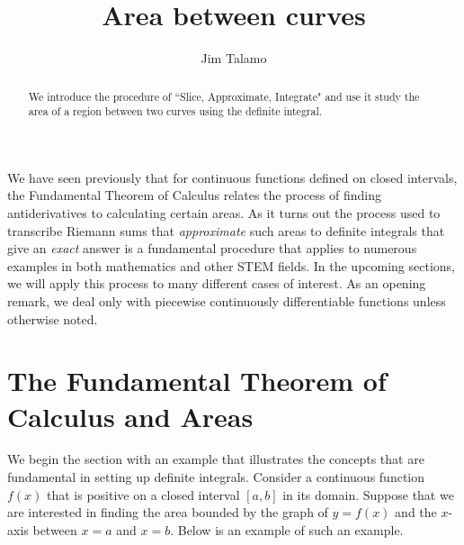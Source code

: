 \documentclass{ximera}
\author{Jim Talamo}
\title[Dig-In:]{Area between curves}
\begin{document}
\begin{abstract}
  We introduce the procedure of ``Slice, Approximate, Integrate" and use it study the area of a region between two curves using the definite integral.
\end{abstract}
\maketitle

We have seen previously that for continuous functions defined on closed intervals, the Fundamental Theorem of Calculus relates the process of finding antiderivatives to calculating certain areas.  As it turns out the process used to transcribe Riemann sums that \emph{approximate} such areas to definite integrals that give an \emph{exact} answer is a fundamental procedure that applies to numerous examples in both mathematics and other STEM fields.  In the upcoming sections, we will apply this process to many different cases of interest.  As an opening remark, we deal only with piecewise continuously differentiable functions unless otherwise noted.  

\section{The Fundamental Theorem of Calculus and Areas}

We begin the section with an example that illustrates the concepts that are fundamental in setting up definite integrals.  Consider a continuous function $f(x)$ that is positive on a closed interval $[a,b]$ in its domain.   Suppose that we are interested in finding the area bounded by the graph of $y=f(x)$ and the $x$-axis between $x=a$ and $x=b$.  Below is an example of such an example.


\begin{image}
\end{image}
\end{document}
